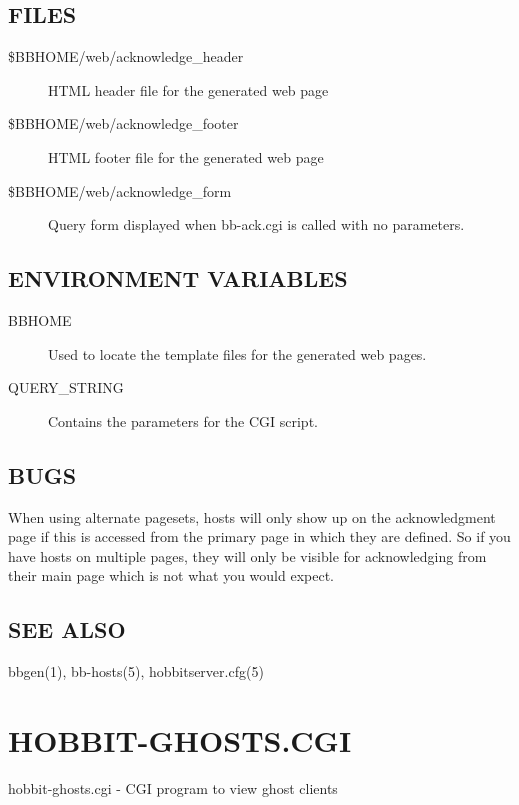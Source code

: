 \subsection{FILES}
\begin{description}
\item[\$BBHOME/web/acknowledge\_header] HTML header file for the generated web page 

 

\item[\$BBHOME/web/acknowledge\_footer] HTML footer file for the generated web page 

 

\item[\$BBHOME/web/acknowledge\_form] Query form displayed when bb-ack.cgi is called with no parameters. 

 
\end{description}
\subsection{ENVIRONMENT VARIABLES}
\begin{description}
\item[BBHOME] Used to locate the template files for the generated web pages. 

 

\item[QUERY\_STRING] Contains the parameters for the CGI script. 

 


\end{description}
\subsection{BUGS}
 When using alternate pagesets, hosts will only show up on the
 acknowledgment page if this is accessed from the primary page in
 which they are defined. So if you have hosts on multiple pages, they
 will only be visible for acknowledging from their main page which is
 not what you would expect. 

 
\subsection{SEE ALSO}
bbgen(1), bb-hosts(5), hobbitserver.cfg(5) 


%
\newpage
\section{HOBBIT-GHOSTS.CGI}
 hobbit-ghosts.cgi - CGI program to view ghost clients
